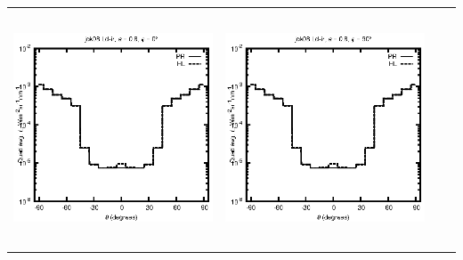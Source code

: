 \begin{tabular}{c c c c}
\includegraphics[height=7cm]{../eps/jok08_Ld_ir_fwd.eps} &
\includegraphics[height=7cm]{../eps/jok08_Ld_ir_cross.eps} \\
\end{tabular}

\pagebreak

